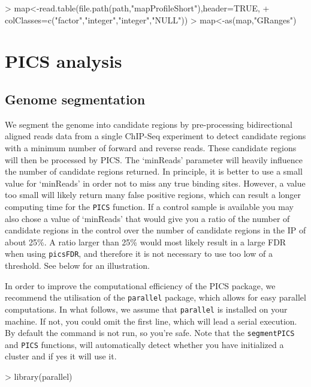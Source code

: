 \documentclass[a4paper]{article}
\begin{document}
\begin{Schunk}
\begin{Sinput}
> map<-read.table(file.path(path,"mapProfileShort"),header=TRUE,
+ colClasses=c("factor","integer","integer","NULL"))
> map<-as(map,"GRanges")
\end{Sinput}
\end{Schunk}


\section{PICS analysis}

\subsection{Genome segmentation}
We segment the genome into candidate regions by pre-processing bidirectional aligned reads data from a single ChIP-Seq experiment to detect candidate regions with a minimum number of forward and reverse reads. These candidate regions will then be processed by PICS. The `minReads' parameter will heavily influence the number of candidate regions returned. In principle, it is better to use a small value for `minReads' in order not to miss any true binding sites. However, a value too small will likely return many false positive regions, which can result a longer computing time for the \texttt{PICS} function.  If a control sample is available you may also chose a value of `minReads' that would give you a ratio of the number of candidate regions in the control over the number of candidate regions in the IP of about 25\%. A ratio larger than 25\% would most likely result in a large FDR when using \texttt{picsFDR}, and therefore it is not necessary to use too low of a threshold. See below for an illustration.  \newline

In order to improve the computational efficiency of the PICS package, we recommend the utilisation of the \texttt{parallel} package, which allows for easy parallel computations. In what follows, we assume that \texttt{parallel} is installed on your machine. If not, you could omit the first line, which will lead a serial execution. By default the command is not run, so you're safe. Note that the \texttt{segmentPICS} and \texttt{PICS} functions, will automatically detect whether you have initialized a cluster and if yes it will use it. 

\begin{Schunk}
\begin{Sinput}
> library(parallel)
\end{Sinput}
\end{Schunk}
\end{document}

